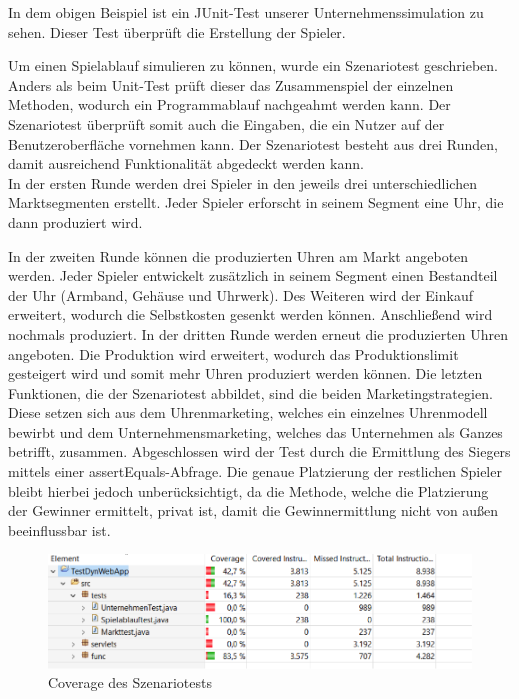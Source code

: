 In dem obigen Beispiel ist ein JUnit-Test unserer Unternehmenssimulation zu sehen. Dieser Test überprüft die Erstellung der Spieler.

Um einen Spielablauf simulieren zu können, wurde ein Szenariotest geschrieben. Anders als beim Unit-Test prüft dieser das Zusammenspiel der einzelnen Methoden, wodurch ein Programmablauf nachgeahmt werden kann. Der Szenariotest überprüft somit auch die Eingaben, die ein Nutzer auf der Benutzeroberfläche vornehmen kann.
Der Szenariotest besteht aus drei Runden, damit ausreichend Funktionalität abgedeckt werden kann. 
\\
In der ersten Runde werden drei Spieler in den jeweils drei unterschiedlichen Marktsegmenten erstellt. Jeder Spieler erforscht in seinem Segment eine Uhr, die dann produziert wird. \par
In der zweiten Runde können die produzierten Uhren am Markt angeboten werden. Jeder Spieler entwickelt zusätzlich in seinem Segment einen Bestandteil der Uhr (Armband, Gehäuse und Uhrwerk). Des Weiteren wird der Einkauf erweitert, wodurch die Selbstkosten gesenkt werden können. Anschließend wird nochmals produziert. 
In der dritten Runde werden erneut die produzierten Uhren angeboten. Die Produktion wird erweitert, wodurch das Produktionslimit gesteigert wird und somit mehr Uhren produziert werden können. Die letzten Funktionen, die der Szenariotest abbildet, sind die beiden Marketingstrategien. Diese setzen sich aus dem Uhrenmarketing, welches ein einzelnes Uhrenmodell bewirbt und dem Unternehmensmarketing, welches das Unternehmen als Ganzes betrifft, zusammen. 
Abgeschlossen wird der Test durch die Ermittlung des Siegers mittels einer assertEquals-Abfrage. Die genaue Platzierung der restlichen Spieler bleibt hierbei jedoch unberücksichtigt, da die Methode, welche die Platzierung der Gewinner ermittelt, privat ist, damit die Gewinnermittlung nicht von außen beeinflussbar ist. 

\begin{figure}[!h]
	\centering
	\includegraphics[scale=0.8]{img/bild1_tests.png} 
	\caption{Coverage des Szenariotests} \label{fig:abb31}
\end{figure}

